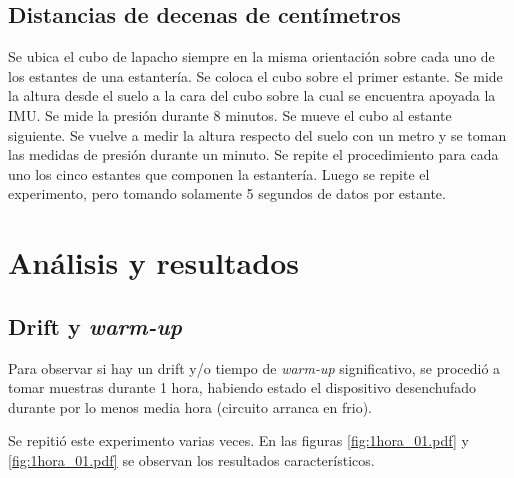 \documentclass[spanish,12pt,a4paper,titlepage]{report}
\begin{document}
\subsection{Distancias de decenas de centímetros}

Se ubica el cubo de lapacho siempre en la misma orientación sobre cada uno de los estantes de una estantería. Se coloca el cubo sobre el primer estante. Se mide la altura desde el suelo a la cara del cubo sobre la cual se encuentra apoyada la IMU. Se mide la presión durante 8 minutos. Se mueve el cubo al estante siguiente. Se vuelve a medir la altura respecto del suelo con un metro y se toman las medidas de presión durante un minuto. Se repite el procedimiento para cada uno los cinco estantes que componen la estantería. Luego se repite el experimento, pero tomando solamente 5 segundos de datos por estante.

\newpage
\section{Análisis y resultados}

\subsection{Drift y \textit{warm-up}}
\label{sec:drift-y-warm-up}

Para observar si hay un drift y/o tiempo de \textit{warm-up} significativo, se procedió a tomar muestras durante 1 hora, habiendo estado el dispositivo desenchufado durante por lo menos media hora (circuito arranca en frio).

Se repitió este experimento varias veces. En las figuras \ref{fig:1hora_01.pdf} y \ref{fig:1hora_01.pdf} se observan los resultados característicos.
\end{document}
